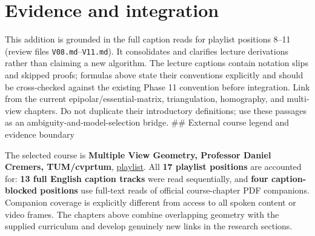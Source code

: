 \section{Evidence and integration}\label{02-foundations-ii-ch039-evidence-and-integration}

This addition is grounded in the full caption reads for playlist positions 8--11 (review files \texttt{V08.md}--\texttt{V11.md}). It consolidates and clarifies lecture derivations rather than claiming a new algorithm. The lecture captions contain notation slips and skipped proofs; formulas above state their conventions explicitly and should be cross-checked against the existing Phase 11 convention before integration. Link from the current epipolar/essential-matrix, triangulation, homography, and multi-view chapters. Do not duplicate their introductory definitions; use these passages as an ambiguity-and-model-selection bridge. \#\# External course legend and evidence boundary

The selected course is \textbf{Multiple View Geometry, Professor Daniel Cremers, TUM/cvprtum}, \href{https://www.youtube.com/playlist?list=PLTBdjV_4f-EJn6udZ34tht9EVIW7lbeo4}{playlist}. All \textbf{17 playlist positions} are accounted for: \textbf{13 full English caption tracks} were read sequentially, and \textbf{four caption-blocked positions} use full-text reads of official course-chapter PDF companions. Companion coverage is explicitly different from access to all spoken content or video frames. The chapters above combine overlapping geometry with the supplied curriculum and develop genuinely new links in the research sections.

